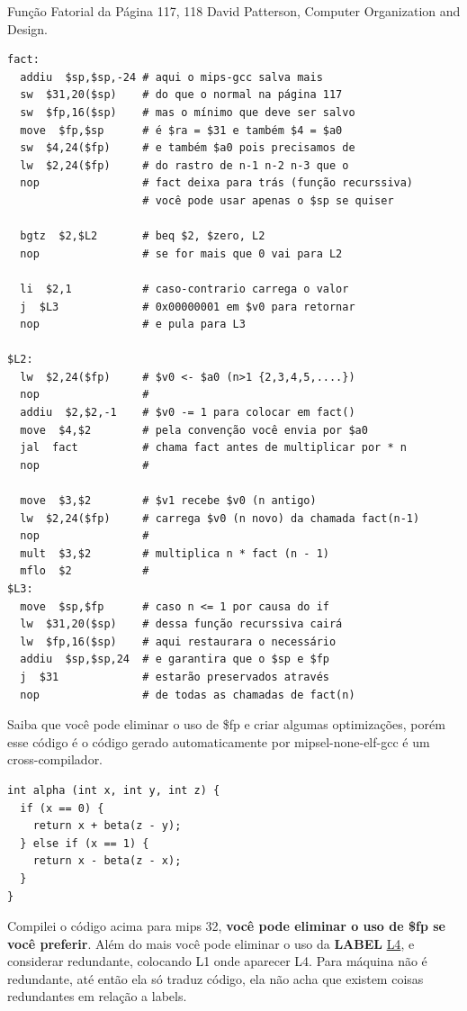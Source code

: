 \documentclass{article}
\begin{document}
\pagebreak
Função Fatorial da Página 117, 118 David Patterson, Computer Organization and
Design.
\begin{verbatim}
fact:
  addiu  $sp,$sp,-24 # aqui o mips-gcc salva mais
  sw  $31,20($sp)    # do que o normal na página 117
  sw  $fp,16($sp)    # mas o mínimo que deve ser salvo
  move  $fp,$sp      # é $ra = $31 e também $4 = $a0
  sw  $4,24($fp)     # e também $a0 pois precisamos de
  lw  $2,24($fp)     # do rastro de n-1 n-2 n-3 que o
  nop                # fact deixa para trás (função recurssiva)
                     # você pode usar apenas o $sp se quiser

  bgtz  $2,$L2       # beq $2, $zero, L2
  nop                # se for mais que 0 vai para L2

  li  $2,1           # caso-contrario carrega o valor
  j  $L3             # 0x00000001 em $v0 para retornar
  nop                # e pula para L3

$L2:
  lw  $2,24($fp)     # $v0 <- $a0 (n>1 {2,3,4,5,....})
  nop                #
  addiu  $2,$2,-1    # $v0 -= 1 para colocar em fact()
  move  $4,$2        # pela convenção você envia por $a0
  jal  fact          # chama fact antes de multiplicar por * n
  nop                #

  move  $3,$2        # $v1 recebe $v0 (n antigo)
  lw  $2,24($fp)     # carrega $v0 (n novo) da chamada fact(n-1)
  nop                #
  mult  $3,$2        # multiplica n * fact (n - 1)
  mflo  $2           #
$L3:
  move  $sp,$fp      # caso n <= 1 por causa do if
  lw  $31,20($sp)    # dessa função recurssiva cairá
  lw  $fp,16($sp)    # aqui restaurara o necessário
  addiu  $sp,$sp,24  # e garantira que o $sp e $fp
  j  $31             # estarão preservados através
  nop                # de todas as chamadas de fact(n)
\end{verbatim}


Saiba que você pode eliminar o uso de \$fp e criar algumas optimizações, porém
esse código é o código gerado automaticamente por mipsel-none-elf-gcc é um
cross-compilador.

\begin{verbatim}
int alpha (int x, int y, int z) {
  if (x == 0) {
    return x + beta(z - y);
  } else if (x == 1) {
    return x - beta(z - x);
  }
}
\end{verbatim}

Compilei o código acima para mips 32, {\bfseries você pode eliminar o uso de
\$fp se você preferir}. Além do mais você pode eliminar o uso da \textbf{LABEL}
\underline{L4}, e considerar redundante, colocando L1 onde aparecer L4. Para
máquina não é redundante, até então ela só traduz código, ela não acha que
existem coisas redundantes em relação a labels.
\end{document}
